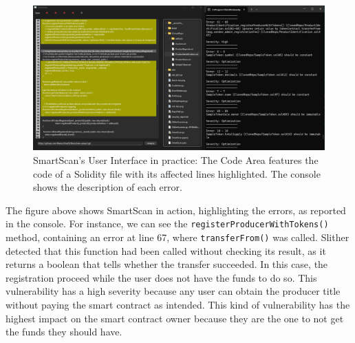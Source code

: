 \begin{figure}[h]
    \centering
    \includegraphics[width=1\linewidth]{images/highlighted-errors.png}
    \caption{SmartScan's User Interface in practice: The Code Area features the code of a Solidity file with its affected lines highlighted. The console shows the description of each error.}
    \label{fig:enter-label}
\end{figure}

The figure above shows SmartScan in action, highlighting the errors, as reported in the console. For instance, we can see the \texttt{registerProducerWithTokens()} method, containing an error at line 67, where \texttt{transferFrom()}\cite{solidityDocs} was called. Slither detected that this function had been called without checking its result, as it returns a boolean that tells whether the transfer succeeded. In this case, the registration proceed while the user does not have the funds to do so. This vulnerability has a high severity because any user can obtain the producer title without paying the smart contract as intended. This kind of vulnerability has the highest impact on the smart contract owner because they are the one to not get the funds they should have.

